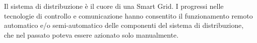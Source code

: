 
Il sistema di distribuzione è il cuore di una Smart Grid. I progressi nelle tecnologie di controllo e comunicazione hanno consentito il funzionamento remoto automatico e/o semi-automatico delle componenti del sistema di distribuzione, che nel passato poteva essere azionato solo manualmente. 
